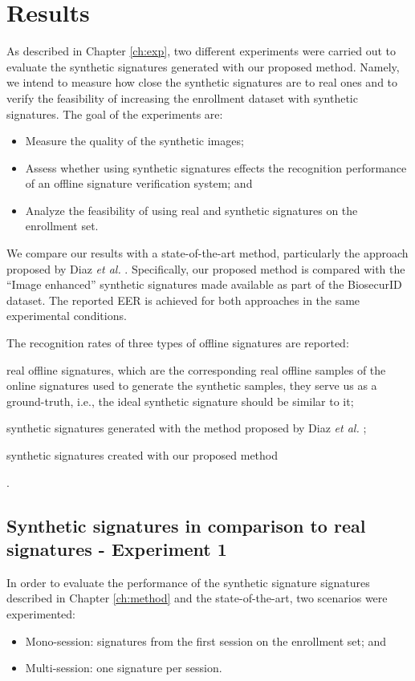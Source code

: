 
\chapter{Results} \label{ch:results}

As described in Chapter \ref{ch:exp}, two different experiments were
carried out to evaluate the synthetic signatures generated with our proposed method. Namely, we intend to measure how close the synthetic signatures are to real ones and to verify the feasibility of increasing the enrollment dataset with synthetic signatures. The goal of the experiments are:
\begin{itemize}
  \item Measure the quality of the synthetic images;
  \item Assess whether using synthetic signatures effects the recognition performance of an offline signature verification system; and
  \item Analyze the feasibility of using real and synthetic signatures
  on the enrollment set.
\end{itemize}

We compare our results with a state-of-the-art method, particularly the approach proposed by Diaz \textit{et al.} \cite{diaz2014generation}. Specifically, our proposed method is compared with the ``Image enhanced'' synthetic signatures made available as part of the BiosecurID \cite{biosecurid} dataset. The reported EER is achieved for both approaches in the same experimental conditions.

The recognition rates of three types of offline signatures are reported: 
\begin{inlinelist}
  \item real offline signatures, which are the corresponding real offline samples of the online signatures used to generate the synthetic samples, they serve us as a ground-truth, i.e., the ideal synthetic signature should be similar to it;
  \item synthetic signatures generated with the method proposed by Diaz \textit{et al.} \cite{diaz2014generation};
  \item synthetic signatures created with our proposed method
\end{inlinelist}.

\section{Synthetic signatures in comparison to real signatures - Experiment 1}
In order to evaluate the performance of the synthetic signature signatures described in Chapter \ref{ch:method} and the state-of-the-art, two scenarios were experimented: 
\begin{itemize}
\item Mono-session: signatures from the first session on the enrollment set; and
\item Multi-session: one signature per session.
\end{itemize}


